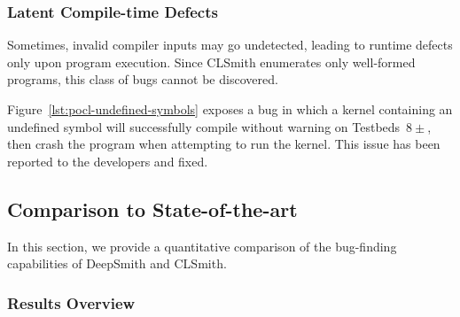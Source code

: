 \subsubsection{Latent Compile-time Defects}

Sometimes, invalid compiler inputs may go undetected, leading to runtime defects
only upon program execution. Since CLSmith enumerates only well-formed programs,
this class of bugs cannot be discovered.

Figure~\ref{lst:pocl-undefined-symbols} exposes a bug in which a kernel
containing an undefined symbol will successfully compile without warning on
Testbeds~$8\pm$, then crash the program when attempting to run the kernel. This
issue has been reported to the developers and fixed.

\subsection{Comparison to State-of-the-art}%
\label{subsec:vs_clsmith}

In this section, we provide a quantitative comparison of the bug-finding
capabilities of DeepSmith and CLSmith.

\subsubsection{Results Overview}

\begin{table}
  \centering %
  \caption{%
  Results from 48 hours of testing using CLSmith. System \#. as
  per Table~\ref{tab:platforms}. $\pm$ denotes optimizations off ($-$) vs on
  ($+$). The remaining columns denote the number of build crash (\bc), build
  timeout (\bto), anomalous build failure (\abf), anomalous runtime crash
  (\arc), anomalous wrong-output (\awo), and pass (\textbf{\cmark}) results.
  }
  
  \label{tab:megatable}
\end{table}

\begin{table}
	\centering %
	\caption{%
		Results from 48 hours of testing using DeepSmith. System \#. as
		per Table~\ref{tab:platforms}. $\pm$ denotes optimizations off ($-$) vs on
		($+$). The remaining columns denote the number of build crash (\bc), build
		timeout (\bto), anomalous build failure (\abf), anomalous runtime crash
		(\arc), anomalous wrong-output (\awo), and pass (\textbf{\cmark}) results.
	}
	
	\label{tab:megatable}
\end{table}

